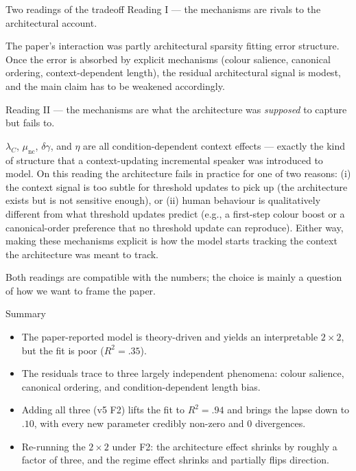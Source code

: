 \documentclass[10pt,aspectratio=169]{beamer}
\begin{document}
\begin{frame}{Two readings of the tradeoff}
\small
Reading I --- the mechanisms are rivals to the architectural account.

The paper's interaction was partly architectural sparsity fitting error structure. Once the error is absorbed by explicit mechanisms (colour salience, canonical ordering, context-dependent length), the residual architectural signal is modest, and the main claim has to be weakened accordingly.

\vspace{1em}
Reading II --- the mechanisms are what the architecture was \emph{supposed} to capture but fails to.

$\lambda_C$, $\mu_\mathrm{nc}$, $\delta\gamma$, and $\eta$ are all condition-dependent context effects --- exactly the kind of structure that a context-updating incremental speaker was introduced to model. On this reading the architecture fails in practice for one of two reasons: (i) the context signal is too subtle for threshold updates to pick up (the architecture exists but is not sensitive enough), or (ii) human behaviour is qualitatively different from what threshold updates predict (e.g., a first-step colour boost or a canonical-order preference that no threshold update can reproduce). Either way, making these mechanisms explicit is how the model starts tracking the context the architecture was meant to track.

\vspace{1em}
Both readings are compatible with the numbers; the choice is mainly a question of how we want to frame the paper.
\end{frame}
\begin{frame}{Summary}
\small
\begin{itemize}\itemsep0.3em
  \item The paper-reported model is theory-driven and yields an interpretable $2\!\times\!2$, but the fit is poor ($R^2 = .35$).
  \item The residuals trace to three largely independent phenomena: colour salience, canonical ordering, and condition-dependent length bias.
  \item Adding all three (v5 F2) lifts the fit to $R^2 = .94$ and brings the lapse down to $.10$, with every new parameter credibly non-zero and 0 divergences.
  \item Re-running the $2\!\times\!2$ under F2: the architecture effect shrinks by roughly a factor of three, and the regime effect shrinks and partially flips direction.
\end{itemize}

\vspace{1em}
\end{frame}
\end{document}
